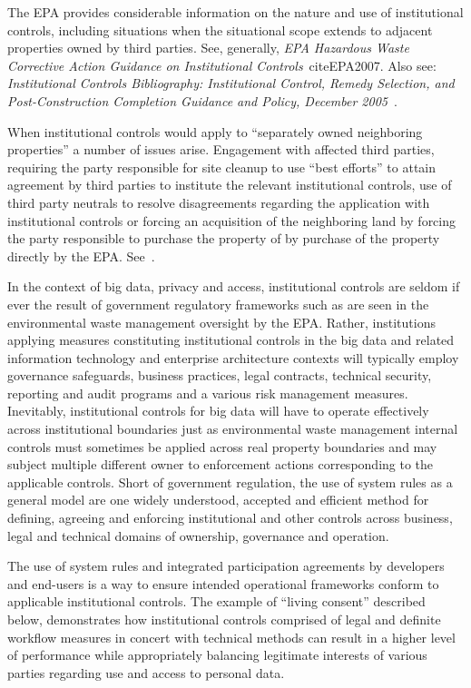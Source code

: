 The EPA provides considerable information on the nature and use of institutional controls, including situations when the situational scope extends to adjacent properties owned by third parties.
See, generally, {\em EPA Hazardous Waste Corrective Action Guidance on Institutional Controls}~cite{EPA2007}.
Also see: {\em Institutional Controls Bibliography: Institutional Control, Remedy Selection, and Post-Construction Completion Guidance and Policy, December 2005}~\cite{EPAbibliography2005}.

When institutional controls would apply to ``separately owned neighboring properties'' a number of issues arise.
Engagement with affected third parties, requiring the party responsible for site cleanup to use ``best efforts''
to attain agreement by third parties to institute the relevant institutional controls, 
use of third party neutrals to resolve disagreements regarding the application with 
institutional controls or forcing an acquisition of the neighboring land by 
forcing the party responsible to purchase the property of by purchase of the property directly by the EPA.
See~\cite{EPA-540-R-09-001}.

In the context of big data, privacy and access, institutional controls are seldom if ever the result of government regulatory frameworks such as are seen in the environmental waste management oversight by the EPA.
Rather, institutions applying measures constituting institutional controls in the big data and related information technology and enterprise architecture contexts will typically employ governance safeguards, business practices, legal contracts, technical security, reporting and audit programs and a various risk management measures.
Inevitably, institutional controls for big data will have to operate effectively across institutional boundaries just as environmental waste management internal controls must sometimes be applied across real property boundaries and may subject multiple different owner to enforcement actions corresponding to the applicable controls.
Short of government regulation, the use of system rules as a general model are one widely understood, accepted and efficient method for defining, agreeing and enforcing institutional and other controls across business, legal and technical domains of ownership, governance and operation.

The use of system rules and integrated participation agreements by developers and end-users is a way to ensure intended operational frameworks conform to applicable institutional controls.
The example of ``living consent'' described below, demonstrates how institutional controls comprised of legal and definite workflow measures in concert with technical methods can result in a higher level of performance while appropriately balancing legitimate interests of various parties regarding use and access to personal data.

